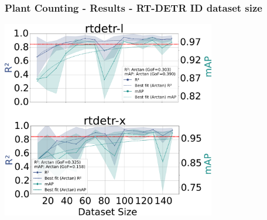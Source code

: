 \documentclass[aspectratio=43]{beamer}
\begin{document}
\begin{frame}
    \frametitle{Plant Counting - Results - RT-DETR ID dataset size}
    \begin{center}
        \includegraphics[width=0.7\textwidth]{Imgs/r2_ap_vs_dataset_size_rtdetr_3.pdf}
    \end{center}
\end{frame}

\end{document}

